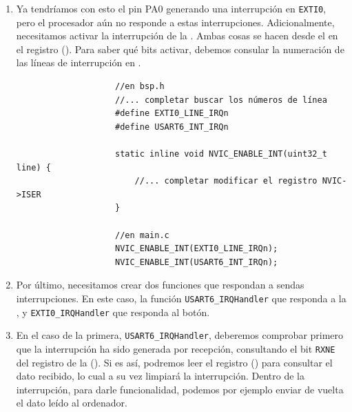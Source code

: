 \documentclass[../main.tex]{subfiles}
\begin{document}
\begin{enumerate}
\begin{lstlisting}
                    //en main.c
                    RCC_APB2ENR->bits.SYSCFGEN = 1;
                    //Activar EINT0 PUERTO A
                    SYSCFG_EINT_MAP_PORT(0, 0); //port a (0) to eint0
                    EXTI_ENABLE_RISING_TRIGGER(0, 1); 	//enable on port a
                    EXTI_UNMASK_INTERRUPT(0, 1);		//unmask on port a
                \end{lstlisting}
            \item Ya tendríamos con esto el pin PA0 generando una interrupción en \texttt{EXTI0}, pero el procesador aún no responde a estas interrupciones. Adicionalmente, necesitamos activar la interrupción de la . Ambas cosas se hacen desde el  en el registro  (\PMMAN[4.2.2]). Para saber qué bits activar, debemos consular la numeración de las líneas de interrupción en \REFMAN[9].
            
                \begin{lstlisting}
                    //en bsp.h
                    //... completar buscar los números de línea
                    #define EXTI0_LINE_IRQn
                    #define USART6_INT_IRQn

                    static inline void NVIC_ENABLE_INT(uint32_t line) {
                        //... completar modificar el registro NVIC->ISER
                    }

                    //en main.c
                    NVIC_ENABLE_INT(EXTI0_LINE_IRQn);
	                NVIC_ENABLE_INT(USART6_INT_IRQn);
                \end{lstlisting}

            \item Por último, necesitamos crear dos funciones que respondan a sendas interrupciones. En este caso, la función \lstinline|USART6_IRQHandler| que responda a la , y \lstinline|EXTI0_IRQHandler| que responda al botón.
            \item En el caso de la primera, \lstinline|USART6_IRQHandler|, deberemos comprobar primero que la interrupción ha sido generada por recepción, consultando el bit \texttt{RXNE} del registro  de la  (\REFMAN[27.8.8]). Si es así, podremos leer el registro  (\REFMAN[27.8.10]) para consultar el dato recibido, lo cual a su vez limpiará la interrupción. Dentro de la interrupción, para darle funcionalidad, podemos por ejemplo enviar de vuelta el dato leído al ordenador.
            

\end{enumerate}
\end{document}
